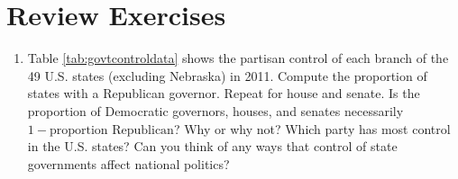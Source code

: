 \documentclass[]{book}
\theoremstyle{definition}
\theoremstyle{definition}
\theoremstyle{definition}
\theoremstyle{remark}
\begin{document}
\section{Review Exercises}\label{review-exercises-1}

\begin{enumerate}
\def\labelenumi{\arabic{enumi}.}
\item
  Table \ref{tab:govtcontroldata} shows the partisan control of each
  branch of the 49 U.S. states (excluding Nebraska) in 2011. Compute the
  proportion of states with a Republican governor. Repeat for house and
  senate. Is the proportion of Democratic governors, houses, and senates
  necessarily \(1 - \text{proportion Republican}\)? Why or why not?
  Which party has most control in the U.S. states? Can you think of any
  ways that control of state governments affect national politics?

  \begin{table}


\end{table}
\end{enumerate}
\end{document}
